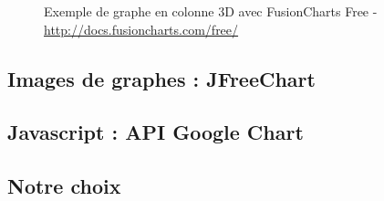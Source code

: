 \begin{enumerate}
\begin{figure}[H]
  \caption{Exemple de graphe en colonne 3D avec FusionCharts Free - \url{http://docs.fusioncharts.com/free/}}
\end{figure}
\end{enumerate}




\subsection{Images de graphes : JFreeChart}

\subsection{Javascript : API Google Chart}

\subsection{Notre choix}